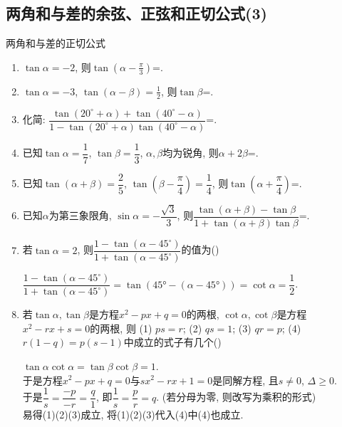\subsection{两角和与差的余弦、正弦和正切公式(3)}
\zsd 两角和与差的正切公式

\begin{enumerate}
\item $\tan\alpha=-2$, 则$\tan\left(\alpha-\frac{\pi}{3}\right)$=. 

\item $\tan\alpha=-3$, $\tan(\alpha-\beta)=\frac{1}{2}$, 则$\tan\beta$=.  

\item 化简: $\dfrac{\tan(20^{\circ}+\alpha)+\tan(40^{\circ}-\alpha)}{1-\tan(20^{\circ}+\alpha)\tan(40^{\circ}-\alpha)}$=. 

\item 已知$\tan\alpha=\dfrac{1}{7}$, $\tan\beta=\dfrac{1}{3}$, $\alpha,\beta$均为锐角, 则$\alpha+2\beta$=.

\item 已知$\tan(\alpha+\beta)=\dfrac{2}{5}$, $\tan\left(\beta-\dfrac{\pi}{4}\right)=\dfrac{1}{4}$, 则$\tan\left(\alpha+\dfrac{\pi}{4}\right)$=. 

\item 已知$\alpha$为第三象限角, $\sin\alpha=-\dfrac{\sqrt3}{3}$, 则$\dfrac{\tan(\alpha+\beta)-\tan\beta}{1+\tan(\alpha+\beta)\tan\beta}$=. 

\item 若$\tan\alpha=2$, 则$\dfrac{1-\tan(\alpha-45^{\circ})}{1+\tan(\alpha-45^{\circ})}$的值为\dotfill()
\begin{jieda}
$\dfrac{1-\tan(\alpha-45^{\circ})}{1+\tan(\alpha-45^{\circ})}=\tan(\ang{45}-(\alpha-\ang{45}))=\cot\alpha=\dfrac{1}{2}$. 
\end{jieda}


\item 若$\tan\alpha,\tan\beta$是方程$x^2-px+q=0$的两根, $\cot\alpha,\cot\beta$是方程$x^2-rx+s=0$的两根, 
则 (1) $ps=r$; (2) $qs=1$; (3) $qr=p$; (4) $r(1-q)=p(s-1)$中成立的式子有几个\dotfill()
\begin{jieda}
$\tan\alpha\cot\alpha=\tan\beta\cot\beta=1$. \\
于是方程$x^2-px+q=0$与$sx^2-rx+1=0$是同解方程, 且$s\neq 0$, $\Delta\geq 0$. \\
于是$\dfrac{1}{s}=\dfrac{-p}{-r}=\dfrac{q}{1}$, 即$\dfrac{1}{s}=\dfrac{p}{r}=q$. (若分母为零, 则改写为乘积的形式)\\
易得(1)(2)(3)成立, 将(1)(2)(3)代入(4)中(4)也成立. 
\end{jieda}



\end{enumerate}
